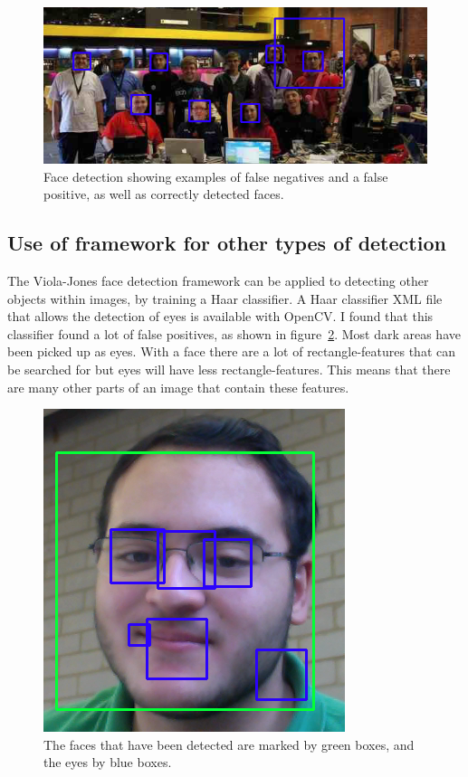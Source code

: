\documentclass[10pt,a4paper,openbib]{article}
\begin{document}
\begin{multicols}{2}
\begin{figure}[H]
\begin{center}
\includegraphics[scale=0.4]{images/plainFaceDetection.png} 
\caption{Face detection showing examples of false negatives and a false positive, as well as correctly detected faces.}
\label{fig:faceDetect}
\end{center}
\end{figure}

\subsection{Use of framework for other types of detection}

The Viola-Jones face detection framework can be applied to detecting other objects within images, by training a Haar classifier. A Haar classifier XML file that allows the detection of eyes is available with OpenCV. I found that this classifier found a lot of false positives, as shown in figure~\ref{fig:eyeDetection}. Most dark areas have been picked up as eyes. With a face there are a lot of rectangle-features that can be searched for but eyes will have less rectangle-features. This means that there are many other parts of an image that contain these features. 

\begin{figure}[H]
\begin{center}
\includegraphics[scale=0.27]{images/eyeDetection.png} 
\caption{The faces that have been detected are marked by green boxes, and the eyes by blue boxes. }
\label{fig:eyeDetection}
\end{center}
\end{figure}


\end{multicols}
\end{document}
